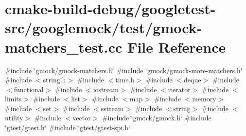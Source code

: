 \hypertarget{gmock-matchers__test_8cc}{}\section{cmake-\/build-\/debug/googletest-\/src/googlemock/test/gmock-\/matchers\+\_\+test.cc File Reference}
\label{gmock-matchers__test_8cc}
{\ttfamily \#include \char`\"{}gmock/gmock-\/matchers.\+h\char`\"{}}\newline
{\ttfamily \#include \char`\"{}gmock/gmock-\/more-\/matchers.\+h\char`\"{}}\newline
{\ttfamily \#include $<$string.\+h$>$}\newline
{\ttfamily \#include $<$time.\+h$>$}\newline
{\ttfamily \#include $<$deque$>$}\newline
{\ttfamily \#include $<$functional$>$}\newline
{\ttfamily \#include $<$iostream$>$}\newline
{\ttfamily \#include $<$iterator$>$}\newline
{\ttfamily \#include $<$limits$>$}\newline
{\ttfamily \#include $<$list$>$}\newline
{\ttfamily \#include $<$map$>$}\newline
{\ttfamily \#include $<$memory$>$}\newline
{\ttfamily \#include $<$set$>$}\newline
{\ttfamily \#include $<$sstream$>$}\newline
{\ttfamily \#include $<$string$>$}\newline
{\ttfamily \#include $<$utility$>$}\newline
{\ttfamily \#include $<$vector$>$}\newline
{\ttfamily \#include \char`\"{}gmock/gmock.\+h\char`\"{}}\newline
{\ttfamily \#include \char`\"{}gtest/gtest.\+h\char`\"{}}\newline
{\ttfamily \#include \char`\"{}gtest/gtest-\/spi.\+h\char`\"{}}\newline
